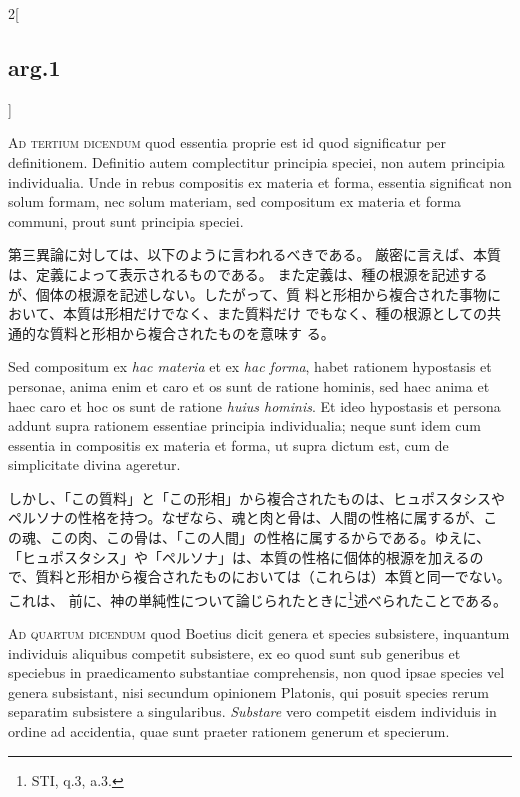 \documentclass[paper=a4paper,fontsize=10pt,jafontsize=9pt,titlepage]{jlreq}
\begin{document}
\begin{paracol}{2}[\subsection{arg.1}]
\switchcolumn*[\subsection{ad.3}]

{\scshape Ad tertium dicendum} quod essentia proprie est id quod significatur per
definitionem. Definitio autem complectitur principia speciei, non autem
principia individualia. Unde in rebus compositis ex materia et forma,
essentia significat non solum formam, nec solum materiam, sed compositum
ex materia et forma communi, prout sunt principia speciei.

\switchcolumn

第三異論に対しては、以下のように言われるべきである。
厳密に言えば、本質は、定義によって表示されるものである。
また定義は、種の根源を記述するが、個体の根源を記述しない。したがって、質
 料と形相から複合された事物において、本質は形相だけでなく、また質料だけ
 でもなく、種の根源としての共通的な質料と形相から複合されたものを意味す
 る。

\switchcolumn*

Sed
compositum ex {\itshape hac materia} et ex {\itshape hac forma}, habet rationem hypostasis et
personae, anima enim et caro et os sunt de ratione hominis, sed haec
anima et haec caro et hoc os sunt de ratione {\itshape huius hominis}. Et ideo
hypostasis et persona addunt supra rationem essentiae principia
individualia; neque sunt idem cum essentia in compositis ex materia et
forma, ut supra dictum est, cum de simplicitate divina ageretur.

\switchcolumn

しかし、「この質料」と「この形相」から複合されたものは、ヒュポスタシスや
 ペルソナの性格を持つ。なぜなら、魂と肉と骨は、人間の性格に属するが、こ
 の魂、この肉、この骨は、「この人間」の性格に属するからである。ゆえに、
 「ヒュポスタシス」や「ペルソナ」は、本質の性格に個体的根源を加えるの
 で、質料と形相から複合されたものにおいては（これらは）本質と同一でない。これは、
 前に、神の単純性について論じられたときに\footnote{STI, q.3, a.3.}述べられたことである。

\switchcolumn*[\subsection{ad.4}]

{\scshape Ad quartum dicendum} quod Boetius dicit genera et species subsistere,
inquantum individuis aliquibus competit subsistere, ex eo quod sunt sub
generibus et speciebus in praedicamento substantiae comprehensis, non
quod ipsae species vel genera subsistant, nisi secundum opinionem
Platonis, qui posuit species rerum separatim subsistere a
singularibus. {\itshape Substare} vero competit eisdem individuis in ordine ad
accidentia, quae sunt praeter rationem generum et specierum.


\end{paracol}
\end{document}
